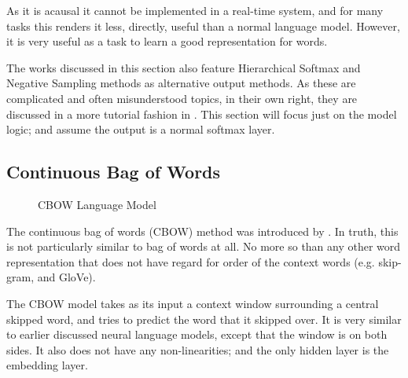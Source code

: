 \documentclass[parskip]{komatufte}
\begin{document}
As it is acausal it cannot be implemented in a real-time system, and for many tasks this renders it less, directly, useful than a normal language model. 
However, it is very useful as a task to learn a good representation for words.




The works discussed in this section also feature Hierarchical Softmax and Negative Sampling methods as alternative output methods.
As these are complicated and often misunderstood topics, in their own right, they are discussed in a more tutorial fashion in .
This section will focus just on the model logic; and assume the output is a normal softmax layer.

\subsection{Continuous Bag of Words}\label{sec:cbow}
\begin{figure}
	\caption{CBOW Language Model}
	\label{fig:cbow}
	\centering
	 
\end{figure}

The continuous bag of words (CBOW) method was introduced by .
In truth, this is not particularly similar to bag of words at all.
No more so than any other word representation that does not have regard for order of the context words (e.g. skip-gram, and GloVe).

The CBOW model takes as its input a context window surrounding a central skipped word, and tries to predict the word that it skipped over.
It is very similar to earlier discussed neural language models, except that the window is on both sides.
It also does not have any non-linearities;
and the only hidden layer is the embedding layer.
\end{document}
